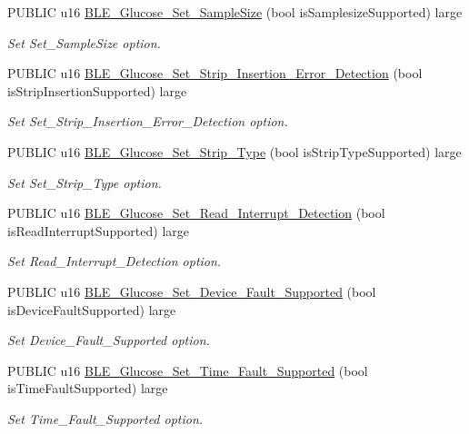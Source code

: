 \begin{DoxyCompactItemize}
P\+U\+B\+L\+IC u16 \hyperlink{group___b_l_e___g_s_ga4dc6981de0f3b8db9b3867390523e3a7}{B\+L\+E\+\_\+\+Glucose\+\_\+\+Set\+\_\+\+Sample\+Size} (bool is\+Samplesize\+Supported) large
\begin{DoxyCompactList}\small\item\em Set Set\+\_\+\+Sample\+Size option. \end{DoxyCompactList}\item 
P\+U\+B\+L\+IC u16 \hyperlink{group___b_l_e___g_s_ga9458017530c8c4ef999d1fd3f38ed226}{B\+L\+E\+\_\+\+Glucose\+\_\+\+Set\+\_\+\+Strip\+\_\+\+Insertion\+\_\+\+Error\+\_\+\+Detection} (bool is\+Strip\+Insertion\+Supported) large
\begin{DoxyCompactList}\small\item\em Set Set\+\_\+\+Strip\+\_\+\+Insertion\+\_\+\+Error\+\_\+\+Detection option. \end{DoxyCompactList}\item 
P\+U\+B\+L\+IC u16 \hyperlink{group___b_l_e___g_s_gac82ac3dd933b9932942941f640aaa3f3}{B\+L\+E\+\_\+\+Glucose\+\_\+\+Set\+\_\+\+Strip\+\_\+\+Type} (bool is\+Strip\+Type\+Supported) large
\begin{DoxyCompactList}\small\item\em Set Set\+\_\+\+Strip\+\_\+\+Type option. \end{DoxyCompactList}\item 
P\+U\+B\+L\+IC u16 \hyperlink{group___b_l_e___g_s_ga0856f5ef2e42f5f3dfcf232314af5023}{B\+L\+E\+\_\+\+Glucose\+\_\+\+Set\+\_\+\+Read\+\_\+\+Interrupt\+\_\+\+Detection} (bool is\+Read\+Interrupt\+Supported) large
\begin{DoxyCompactList}\small\item\em Set Read\+\_\+\+Interrupt\+\_\+\+Detection option. \end{DoxyCompactList}\item 
P\+U\+B\+L\+IC u16 \hyperlink{group___b_l_e___g_s_gae142c41f60ecb05b23337811718108ab}{B\+L\+E\+\_\+\+Glucose\+\_\+\+Set\+\_\+\+Device\+\_\+\+Fault\+\_\+\+Supported} (bool is\+Device\+Fault\+Supported) large
\begin{DoxyCompactList}\small\item\em Set Device\+\_\+\+Fault\+\_\+\+Supported option. \end{DoxyCompactList}\item 
P\+U\+B\+L\+IC u16 \hyperlink{group___b_l_e___g_s_gac6116a7f9682ef00eb79fbd66e89c398}{B\+L\+E\+\_\+\+Glucose\+\_\+\+Set\+\_\+\+Time\+\_\+\+Fault\+\_\+\+Supported} (bool is\+Time\+Fault\+Supported) large
\begin{DoxyCompactList}\small\item\em Set Time\+\_\+\+Fault\+\_\+\+Supported option. \end{DoxyCompactList}\item 

\end{DoxyCompactItemize}

